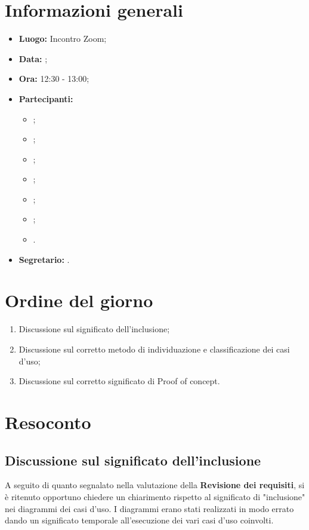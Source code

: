 \section{Informazioni generali}
\begin{itemize}
\item \textbf{Luogo:} Incontro Zoom;
\item \textbf{Data:} \Data;
\item \textbf{Ora:} 12:30 - 13:00;
\item \textbf{Partecipanti:}
	\begin{itemize}
		\item \BL{}; 
		\item \FF{};
		\item \PC{};
		\item \TG{};
		\item \TL{};
		\item \VD{};
		\item \CR{}.
	\end{itemize}
\item \textbf{Segretario:} \TG{}.
\end{itemize}

\section{Ordine del giorno}
\begin{enumerate}
	\item Discussione sul significato dell'inclusione;
	\item Discussione sul corretto metodo di individuazione e classificazione dei casi d'uso;
	\item Discussione sul corretto significato di Proof of concept.
\end{enumerate}

\section{Resoconto}
\subsection{Discussione sul significato dell'inclusione}
A seguito di quanto segnalato nella valutazione della \textbf{Revisione dei requisiti}, si è ritenuto opportuno chiedere un chiarimento rispetto al significato di "inclusione" nei diagrammi dei casi d'uso. I diagrammi erano stati realizzati in modo errato dando un significato temporale all'esecuzione dei vari casi d'uso coinvolti.

